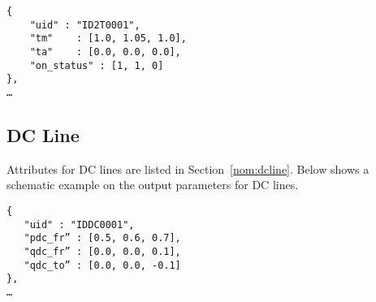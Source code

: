 \begin{verbatim}
{
    "uid" : "ID2T0001",
    "tm"    : [1.0, 1.05, 1.0],
    "ta"    : [0.0, 0.0, 0.0],
    "on_status" : [1, 1, 0]
},
…     
\end{verbatim}

\subsection{DC Line}
\label{sec:output_dcline}
Attributes for DC lines are listed in Section~\ref{nom:dcline}.
Below shows a schematic example on the output parameters for DC lines.
\begin{verbatim}
{
   "uid" : "IDDC0001",
   "pdc_fr” : [0.5, 0.6, 0.7],
   "qdc_fr” : [0.0, 0.0, 0.1],
   "qdc_to” : [0.0, 0.0, -0.1]
},
…    
\end{verbatim}






